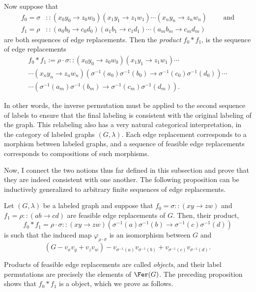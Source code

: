 \begin{definition}\label{def:concatenation-fer}
    Now suppose that \begin{align*}
    f_0=\sigma&::(x_0y_0\to z_0w_0)(x_1y_1\to z_1w_1)\cdots(x_ny_n\to z_nw_n)\qquad\text{ and}\\
    f_1=\rho&::(a_0b_0\to c_0d_0)(a_1b_1\to c_1d_1)\cdots(a_mb_m\to c_md_m)
    \end{align*}
    are both sequences of edge replacements.
    Then the \emph{product} $f_0*f_1$, is the sequence of edge replacements \begin{align*}
        f_0*f_1:=\rho\cdot\sigma::(x_0y_0\to z_0w_0)(x_1y_1\to z_1w_1)\cdots\\
        \cdots(x_ny_n\to z_nw_n)(\sigma^{-1}(a_0)\sigma^{-1}(b_0)\to \sigma^{-1}(c_0)\sigma^{-1}(d_0))\cdots\\
        \cdots(\sigma^{-1}(a_m)\sigma^{-1}(b_m)\to\sigma^{-1}(c_m)\sigma^{-1}(d_m)).
    \end{align*}
\end{definition}

In other words, the inverse permutation must be applied to the second sequence of labels to ensure that the final labeling is consistent with the original labeling of the graph.
This relabeling also has a very natural categorical interpretation, in the category of labeled graphs $(G,\lambda)$.
Each edge replacement corresponds to a morphism between labeled graphs, and a sequence of feasible edge replacements corresponds to compositions of such morphisms.

Now, I connect the two notions thus far defined in this subsection and prove that they are indeed consistent with one another.
The following proposition can be inductively generalized to arbitrary finite sequences of edge replacements.

\begin{proposition}\label{prop:fer-is-well-defined}
    Let $(G,\lambda)$ be a labeled graph and suppose that $f_0=\sigma::(xy\to zw)$ and $f_1=\rho::(ab\to cd)$ are feasible edge replacements of $G$.
    Then, their product, $$f_0*f_1=\rho\cdot\sigma::(xy\to zw)(\sigma^{-1}(a)\sigma^{-1}(b)\to\sigma^{-1}(c)\sigma^{-1}(d))$$ is such that the induced map $\varphi_{\rho\cdot\sigma}$ is an isomorphism between $G$ and $$(G-v_xv_y+v_zv_w)-v_{\sigma^{-1}(a)}v_{\sigma^{-1}(b)}+v_{\sigma^{-1}(c)}v_{\sigma^{-1}(d)}.$$
\end{proposition}

Products of feasible edge replacements are called \tfer \emph{objects}, and their label permutations are precisely the elements of $\Fer(G)$.
The preceding proposition shows that $f_0*f_1$ is a \tfer object, which we prove as follows.

